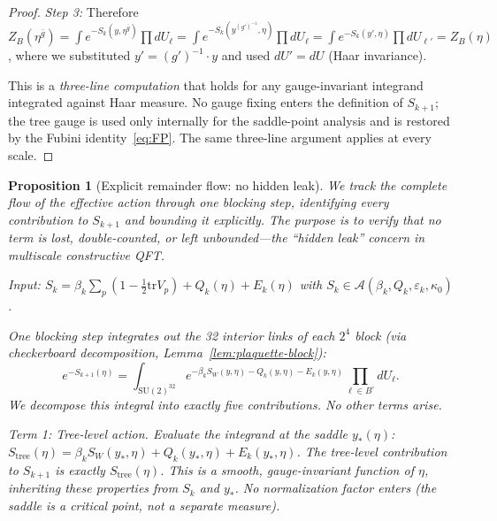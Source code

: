 \documentclass[11pt]{article}
\newtheorem{proposition}[theorem]{Proposition}
\theoremstyle{definition}
\newcommand{\SU}{\mathrm{SU}}
\newcommand{\tr}{\mathrm{tr}}
\begin{document}
\begin{proof}
\emph{Step 3:} Therefore
$Z_B(\eta^{\bar g})
=\int e^{-S_k(y,\eta^{\bar g})}\prod dU_\ell
=\int e^{-S_k(y^{(g')^{-1}},\eta)}\prod dU_\ell
=\int e^{-S_k(y',\eta)}\prod dU_{\ell'}
=Z_B(\eta)$,
where we substituted $y'=(g')^{-1}\cdot y$ and used
$dU'=dU$ (Haar invariance).

This is a \emph{three-line computation} that holds for
any gauge-invariant integrand integrated against
Haar measure.  No gauge fixing enters the definition of
$S_{k+1}$; the tree gauge is used only internally for
the saddle-point analysis and is restored by the
Fubini identity~\eqref{eq:FP}.  The same three-line
argument applies at every scale.
\end{proof}

\begin{proposition}[Explicit remainder flow: no hidden leak]%
\label{prop:no-leak}
We track the complete flow of the effective action through
one blocking step, identifying every contribution to
$S_{k+1}$ and bounding it explicitly.
The purpose is to verify that no term is lost, double-counted,
or left unbounded---the ``hidden leak'' concern in
multiscale constructive QFT.

\emph{Input:}
$S_k=\beta_k\sum_p(1-\frac{1}{2}\tr V_p)
+Q_k(\eta)+E_k(\eta)$
with $S_k\in\mathcal{A}(\beta_k,Q_k,\varepsilon_k,\kappa_0)$.

\emph{One blocking step} integrates out the 32 interior
links of each $2^4$ block (via checkerboard decomposition,
Lemma~\ref{lem:plaquette-block}):
\begin{equation}\label{eq:full-flow}
e^{-S_{k+1}(\eta)}
=\int_{\SU(2)^{32}}
e^{-\beta_k S_W(y,\eta)-Q_k(y,\eta)-E_k(y,\eta)}
\prod_{\ell\in B^\circ}dU_\ell.
\end{equation}
We decompose this integral into exactly five contributions.
No other terms arise.

\emph{Term 1: Tree-level action.}
Evaluate the integrand at the saddle $y_*(\eta)$:
$S_{\mathrm{tree}}(\eta)=\beta_k S_W(y_*,\eta)
+Q_k(y_*,\eta)+E_k(y_*,\eta)$.
The tree-level contribution to $S_{k+1}$ is exactly
$S_{\mathrm{tree}}(\eta)$.  This is a smooth,
gauge-invariant function of $\eta$, inheriting these
properties from $S_k$ and $y_*$.
No normalization factor enters (the saddle is a
critical point, not a separate measure).


\end{proposition}
\end{document}
